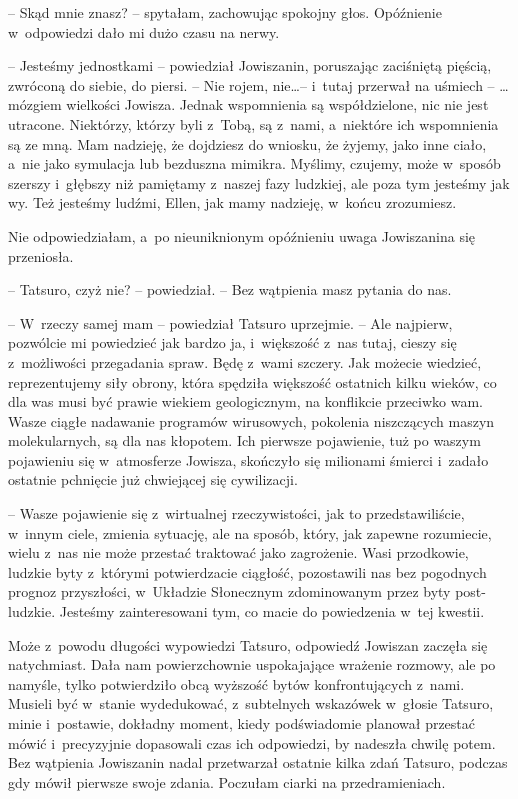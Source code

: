 \documentclass[oneside,polish,11pt,sfheadings]{mwbk}
\begin{document}
-- Skąd mnie znasz? -- spytałam, zachowując spokojny głos. Opóźnienie w~odpowiedzi dało mi dużo czasu na nerwy.

-- Jesteśmy jednostkami -- powiedział Jowiszanin, poruszając zaciśniętą
pięścią, zwróconą do siebie, do piersi. -- Nie rojem, nie\ldots  -- i~tutaj
przerwał na uśmiech -- \ldots  mózgiem wielkości Jowisza. Jednak wspomnienia
są współdzielone, nic nie jest utracone. Niektórzy, którzy byli z~Tobą,
są z~nami, a~niektóre ich wspomnienia są ze mną. Mam nadzieję, że
dojdziesz do wniosku, że żyjemy, jako inne ciało, a~nie jako symulacja
lub bezduszna mimikra. Myślimy, czujemy, może w~sposób szerszy i~głębszy
niż pamiętamy z~naszej fazy ludzkiej, ale poza tym jesteśmy jak wy. Też
jesteśmy ludźmi, Ellen, jak mamy nadzieję, w~końcu zrozumiesz.

Nie odpowiedziałam, a~po nieuniknionym opóźnieniu uwaga Jowiszanina się
przeniosła.

-- Tatsuro, czyż nie? -- powiedział. -- Bez wątpienia masz pytania do nas.

-- W~rzeczy samej mam -- powiedział Tatsuro uprzejmie. -- Ale najpierw,
pozwólcie mi powiedzieć jak bardzo ja, i~większość z~nas tutaj, cieszy
się z~możliwości przegadania spraw. Będę z~wami szczery. Jak możecie
wiedzieć, reprezentujemy siły obrony, która spędziła większość ostatnich
kilku wieków, co dla was musi być prawie wiekiem geologicznym, na
konflikcie przeciwko wam. Wasze ciągłe nadawanie programów wirusowych,
pokolenia niszczących maszyn molekularnych, są dla nas kłopotem. Ich
pierwsze pojawienie, tuż po waszym pojawieniu się w~atmosferze Jowisza,
skończyło się milionami śmierci i~zadało ostatnie pchnięcie już
chwiejącej się cywilizacji.

-- Wasze pojawienie się z~wirtualnej rzeczywistości, jak to
przedstawiliście, w~innym ciele, zmienia sytuację, ale na sposób, który,
jak zapewne rozumiecie, wielu z~nas nie może przestać traktować jako
zagrożenie. Wasi przodkowie, ludzkie byty z~którymi potwierdzacie
ciągłość, pozostawili nas bez pogodnych prognoz przyszłości, w~Układzie
Słonecznym zdominowanym przez byty post-ludzkie. Jesteśmy zainteresowani
tym, co macie do powiedzenia w~tej kwestii.

Może z~powodu długości wypowiedzi Tatsuro, odpowiedź Jowiszan zaczęła
się natychmiast. Dała nam powierzchownie uspokajające wrażenie rozmowy,
ale po namyśle, tylko potwierdziło obcą wyższość bytów konfrontujących z~nami. Musieli być w~stanie wydedukować, z~subtelnych wskazówek w~głosie
Tatsuro, minie i~postawie, dokładny moment, kiedy podświadomie planował
przestać mówić i~precyzyjnie dopasowali czas ich odpowiedzi, by nadeszła
chwilę potem. Bez wątpienia Jowiszanin nadal przetwarzał ostatnie kilka
zdań Tatsuro, podczas gdy mówił pierwsze swoje zdania. Poczułam ciarki
na przedramieniach.
\end{document}
